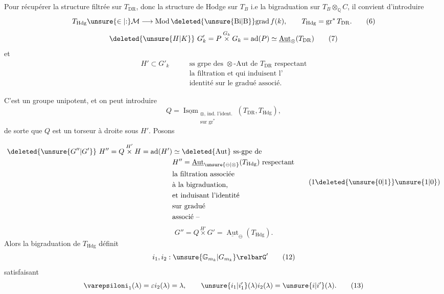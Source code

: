 Pour récupérer la structure filtrée sur $T_{\mathrm{DR}}$,  donc la structure de Hodge sur $T_B$ i.e la bigraduation sur $T_B\otimes_{\mathbb Q}C$, il convient d'introduire
\[
T_{\mathrm{Hdg}}\unsure{\in|\mathord{:}}\mathcal M\longrightarrow\operatorname{Mod}\deleted{\unsure{\mathrm{Bi}|\mathrm B}}\mathrm{grad}\,f(k),\qquad T_{\mathrm{Hdg}}=\operatorname{gr}^{*}T_{\mathrm{DR}}.\tag*{(6)}
\]
  
\[
\deleted{\unsure{H|K}}\ G'_k=P\overset{G_k}{\times}G_k=\operatorname{ad}(P)\simeq\underline{\operatorname{Aut}}_{\otimes}(T_{\mathrm{DR}})\tag*{(7)}
\]
 et
\[
\begin{aligned}
H'\subset G'_k\qquad &\text{ss grpe des $\otimes$-Aut de $T_{\mathrm{DR}}$ respectant}\\
&\text{la filtration et qui induisent l'}\\
&\text{identité sur le gradué associé.}
\end{aligned}\tag*{(8)}
\]
\endgroup


\begingroup\makeatletter\tagsleft@true\makeatother
C'est un groupe unipotent, et on peut introduire
\[
Q=\underline{\operatorname{Isom}}_{\substack{\otimes,\,\text{ind. l'ident.}\\\text{sur }\operatorname{gr}^{*}}}(T_{\mathrm{DR}},T_{\mathrm{Hdg}}),\tag*{(9)}
\]
de sorte que $Q$ est un torseur à droite sous $H'$. Posons

\reversemarginpar
{}
\normalmarginpar
\[
\begin{aligned}
\deleted{\unsure{G''|G'}}\ H''=Q\overset{H'}{\times}H=\operatorname{ad}(H')&\simeq\deleted{\operatorname{Aut}}\ \text{ss-gpe de}\\
&H''=\underline{\operatorname{Aut}}_{\unsure{\ominus|\otimes}}(T_{\mathrm{Hdg}})\ \text{respectant}\\
&\text{la filtration associée}\\
&\text{à la bigraduation,}\\
&\text{et induisant l'identité}\\
&\text{sur gradué}\\
&\text{associé --}
\end{aligned}\tag*{(1\deleted{\unsure{0|1}}\unsure{1|0})}
\]
\[
G''=Q\overset{H'}{\times}G'=\underline{\operatorname{Aut}}_{\ominus}(T_{\mathrm{Hdg}}).\tag*{(10)}
\]
Alors la bigraduation de $T_{\mathrm{Hdg}}$ définit
\[
i_1,i_2:\unsure{\mathbb{G}_{m_k}|G_{m_k}}\relbarG'\tag*{(12)}
\]
satisfaisant
\[
\varepsiloni_1(\lambda)=\varepsilon i_2(\lambda)=\lambda,\qquad \unsure{i_1|i'_1}(\lambda)i_2(\lambda)=\unsure{i|i'}(\lambda).\tag*{(13)}
\]

